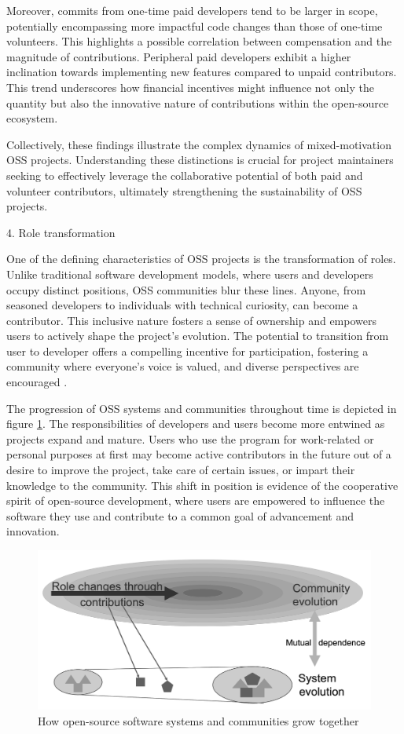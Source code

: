Moreover, commits from one-time paid developers tend to be larger in scope, potentially encompassing more impactful code changes than those of one-time volunteers. This highlights a possible correlation between compensation and the magnitude of contributions. Peripheral paid developers exhibit a higher inclination towards implementing new features compared to unpaid contributors. This trend underscores how financial incentives might influence not only the quantity but also the innovative nature of contributions within the open-source ecosystem.

Collectively, these findings illustrate the complex dynamics of mixed-motivation OSS projects. Understanding these distinctions is crucial for project maintainers seeking to effectively leverage the collaborative potential of both paid and volunteer contributors, ultimately strengthening the sustainability of OSS projects.

4. Role transformation

One of the defining characteristics of OSS projects is the transformation of roles.  Unlike traditional software development models, where users and developers occupy distinct positions, OSS communities blur these lines.  Anyone, from seasoned developers to individuals with technical curiosity, can become a contributor.  This inclusive nature fosters a sense of ownership and empowers users to actively shape the project's evolution.  The potential to transition from user to developer offers a compelling incentive for participation, fostering a community where everyone's voice is valued, and diverse perspectives are encouraged \citep{06ye2003toward,09lakhani2005hackers}.

The progression of OSS systems and communities throughout time is depicted in figure \ref{fig:roleMotivation}.  The responsibilities of developers and users become more entwined as projects expand and mature.  Users who use the program for work-related or personal purposes at first may become active contributors in the future out of a desire to improve the project, take care of certain issues, or impart their knowledge to the community.  This shift in position is evidence of the cooperative spirit of open-source development, where users are empowered to influence the software they use and contribute to a common goal of advancement and innovation.


\begin{figure}[ht]
    \centering
    \includegraphics[width=0.65\linewidth]{figs/roleMotivation.png}
    \caption{How open-source software systems and communities grow together \citep{06ye2003toward} }
    \label{fig:roleMotivation}
\end{figure}



